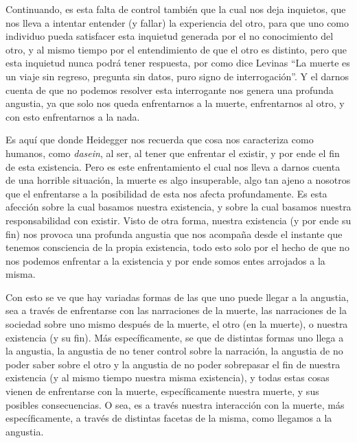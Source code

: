 \documentclass{homework}
\begin{document}
Continuando, es esta falta de control también que la cual nos deja inquietos, que nos lleva a intentar entender (y fallar) la experiencia del otro, para que uno como individuo pueda satisfacer esta inquietud generada por el no conocimiento del otro, y al mismo tiempo por el entendimiento de que el otro es distinto, pero que esta inquietud nunca podrá tener respuesta, por como dice Levinas ``La muerte es un viaje sin regreso, pregunta sin datos, puro signo de interrogación''. Y el darnos cuenta de que no podemos resolver esta interrogante nos genera una profunda angustia, ya que solo nos queda enfrentarnos a la muerte, enfrentarnos al otro, y con esto enfrentarnos a la nada.

Es aquí que donde Heidegger nos recuerda que cosa nos caracteriza como humanos, como \textit{dasein}, al ser, al tener que enfrentar el existir, y por ende el fin de esta existencia. Pero es este enfrentamiento el cual nos lleva a darnos cuenta de una horrible situación, la muerte es algo insuperable, algo tan ajeno a nosotros que el enfrentarse a la posibilidad de esta nos afecta profundamente. Es esta afección sobre la cual basamos nuestra existencia, y sobre la cual basamos nuestra responsabilidad con existir. Visto de otra forma, nuestra existencia (y por ende su fin) nos provoca una profunda angustia que nos acompaña desde el instante que tenemos consciencia de la propia existencia, todo esto solo por el hecho de que no nos podemos enfrentar a la existencia y por ende somos entes arrojados a la misma.

Con esto se ve que hay variadas formas de las que uno puede llegar a la angustia, sea a través de enfrentarse con las narraciones de la muerte, las narraciones de la sociedad sobre uno mismo después de la muerte, el otro (en la muerte), o nuestra existencia (y su fin). Más específicamente, se que de distintas formas uno llega a la angustia, la angustia de no tener control sobre la narración, la angustia de no poder saber sobre el otro y la angustia de no poder sobrepasar el fin de nuestra existencia (y al mismo tiempo nuestra misma existencia), y todas estas cosas vienen de enfrentarse con la muerte, específicamente nuestra muerte, y sus posibles consecuencias. O sea, es a través nuestra interacción con la muerte, más específicamente, a través de distintas facetas de la misma, como llegamos a la angustia.
\end{document}
